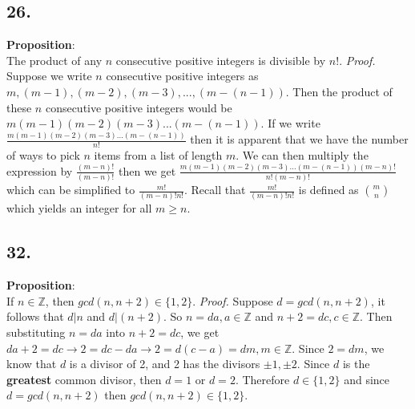 \documentclass[12pt]{article}
\begin{document}
\begin{minipage}[t]{0.40\textwidth}


\subsection*{26.}
\textbf{Proposition}:  \\The product of any $ n $ consecutive positive integers is divisible by $ n! $.
\newline\textit{Proof.} Suppose we write $ n $ consecutive positive integers as $ m,(m-1),(m-2),(m-3),...,(m-(n-1)) $. Then the product of these $ n $ consecutive positive integers would be $ m(m-1)(m-2)(m-3)...(m-(n-1))$. If we write $ \frac{m(m-1)(m-2)(m-3)...(m-(n-1))}{n!} $ then it is apparent that we have the number of ways to pick $ n $ items from a list of length $ m $. We can then multiply the expression by $ \frac{(m-n)!}{(m-n)!} $ then we get $ \frac{m(m-1)(m-2)(m-3)...(m-(n-1))(m-n)!}{n!(m-n)!} $ which can be simplified to $ \frac{m!}{(m-n)!n!} $. Recall that $ \frac{m!}{(m-n)!n!} $ is defined as $ {m}\choose{n} $ which yields an integer for all $ m\geq n $.

\subsection*{32.}
\textbf{Proposition}:  \\If $ n\in\mathbb{Z} $, then $ gcd(n,n+2)\in\{1,2\} $.  
\newline\textit{Proof.} Suppose $ d=gcd(n,n+2) $, it follows that $ d|n $ and $ d|(n+2) $. So $ n=da, a\in\mathbb{Z} $ and $ n+2=dc, c\in\mathbb{Z} $. Then substituting $ n=da $ into $  n+2=dc $, we get $ da+2=dc\rightarrow 2=dc-da\rightarrow 2=d(c-a)=dm, m\in\mathbb{Z} $. Since $ 2=dm $, we know that $ d $ is a divisor of 2, and 2 has the divisors $ \pm1,\pm2 $. Since $ d $ is the \textbf{greatest} common divisor, then $ d=1 $ or $ d=2 $. Therefore $ d\in\{1,2\} $ and since $ d=gcd(n,n+2) $ then $ gcd(n,n+2)\in\{1,2\} $.


\end{minipage}
\hfill\vline\hfill
\end{document}
